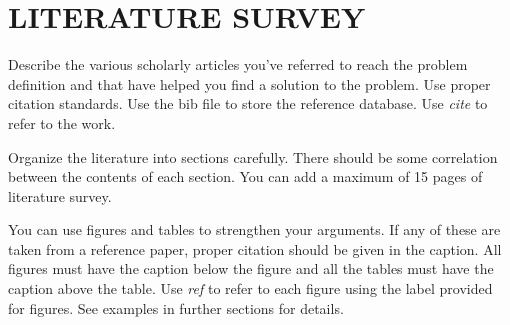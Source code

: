 \chapter{LITERATURE SURVEY}
\par Describe the various scholarly articles you've referred to reach the problem definition and that have helped you find a solution to the problem. Use proper citation standards. Use the bib file to store the reference database. Use \emph{cite} to refer to the work.

\par Organize the literature into sections carefully. There should be some correlation between the contents of each section. You can add a maximum of 15 pages of literature survey.

\par You can use figures and tables to strengthen your arguments. If any of these are taken from a reference paper, proper citation should be given in the caption. All figures must have the caption below the figure and all the tables must have the caption above the table. Use \emph{ref} to refer to each figure using the label provided for figures. See examples in further sections for details.
\newpage
